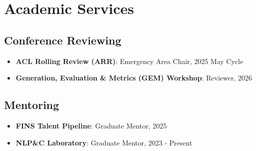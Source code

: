 
\section*{Academic Services}

\subsection*{Conference Reviewing}

\begin{itemize}
    \item \textbf{ACL Rolling Review (ARR)}: Emergency Area Chair, 2025 May Cycle
    \item \textbf{Generation, Evaluation \& Metrics (GEM) Workshop}: Reviewer, 2026
\end{itemize}

\subsection*{Mentoring}

\begin{itemize}
    \item \textbf{FINS Talent Pipeline}: Graduate Mentor, 2025
    \item \textbf{NLP\&C Laboratory}: Graduate Mentor, 2023 - Present
\end{itemize}
\vspace{0.05in}


